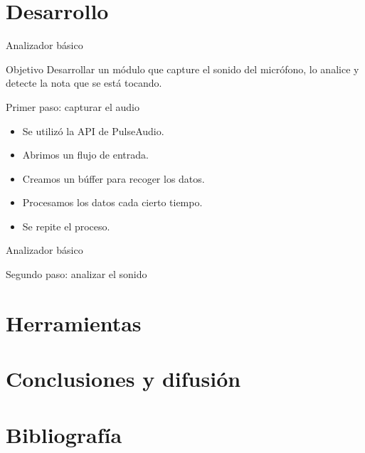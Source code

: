 \documentclass[11pt,xcolor=svgnames]{beamer}
\begin{document}
\section{Desarrollo}
\begin{frame}{Analizador básico}
  \begin{block}{Objetivo}
    Desarrollar un módulo que capture el sonido del micrófono, lo analice y
    detecte la nota que se está tocando.
  \end{block}

  \pause

  \begin{block}{Primer paso: capturar el audio}
    \begin{itemize}
    \item Se utilizó la API de PulseAudio.
    \item Abrimos un flujo de entrada.
    \item Creamos un búffer para recoger los datos.
    \item Procesamos los datos cada cierto tiempo.
    \item Se repite el proceso.
    \end{itemize}
    
  \end{block}
\end{frame}

\begin{frame}{Analizador básico}
  \begin{block}{Segundo paso: analizar el sonido}
    
  \end{block}  
\end{frame}

\section{Herramientas}

\section{Conclusiones y difusión}

\section{Bibliografía}
\end{document}
